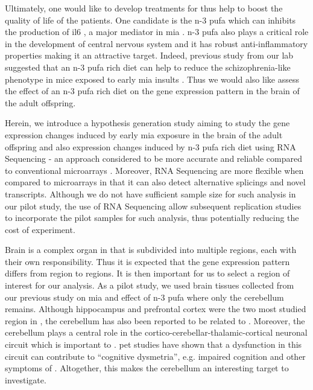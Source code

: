 Ultimately, one would like to develop treatments for  thus help to boost the quality of life of the  patients.
One candidate is the n-3 \gls{pufa} which can inhibits the production of \gls{il6} \citep{Trebble2003}, a major mediator in \gls{mia} \citep{Smith2007}.
n-3 \gls{pufa} also plays a critical role in the development of central nervous system \citep{Clandinin1999} and it has robust anti-inflammatory properties \citep{Trebble2003} making it an attractive target.
Indeed, previous study from our lab suggested that an n-3 \gls{pufa} rich diet can help to reduce the schizophrenia-like phenotype in mice exposed to early \gls{mia} insults \citep{Li2015}. 
Thus we would also like assess the effect of an n-3 \gls{pufa} rich diet on the gene expression pattern in the brain of the adult offspring.

Herein, we introduce a hypothesis generation study aiming to study the gene expression changes induced by early \gls{mia} exposure in the brain of the adult offspring and also expression changes induced by n-3 \gls{pufa} rich diet using RNA Sequencing - an approach considered to be more accurate and reliable compared to conventional microarrays \citep{Wang2009d}.
Moreover, RNA Sequencing are more flexible when compared to microarrays in that it can also detect alternative splicings and novel transcripts. 
Although we do not have sufficient sample size for such analysis in our pilot study, the use of RNA Sequencing allow subsequent replication studies to incorporate the pilot samples for such analysis, thus potentially reducing the cost of experiment.

Brain is a complex organ in that is subdivided into multiple regions, each with their own responsibility.
Thus it is expected that the gene expression pattern differs from region to regions.
It is then important for us to select a region of interest for our analysis. 
As a pilot study, we used brain tissues collected from our previous study on \gls{mia} and effect of n-3 \gls{pufa} \citep{Li2015} where only the cerebellum remains.
Although hippocampus \citep{Velakoulis2006,Nugent2007} and prefrontal cortex \citep{Knable1997,Perlstein2001} were the two most studied region in , the cerebellum has also been reported to be related to  \citep{Yeganeh-Doost2011,Andreasen2008}.
Moreover, the cerebellum plays a central role in the cortico-cerebellar-thalamic-cortical neuronal circuit which is important to .
\Gls{pet} studies have shown that a dysfunction in this circuit can contribute to ``cognitive dysmetria'', e.g. impaired cognition and other symptoms of  \citep{Yeganeh-Doost2011}.
Altogether, this makes the cerebellum an interesting target to investigate.

